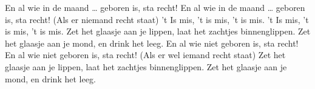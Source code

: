 \beginverse*
En al wie in de maand … geboren is, sta recht!
En al wie in de maand … geboren is, sta recht!
\endverse
\beginchorus
 (Als er niemand recht staat)
't Is mis, 't is mis, 't is mis.
't Is mis, 't is mis, 't is mis.
\endchorus
\beginchorus
Zet het glaasje aan je lippen,
laat het zachtjes binnenglippen.
Zet het glaasje aan je mond,
en drink het leeg.
\endchorus
\beginverse*
En al wie niet geboren is, sta recht!
En al wie niet geboren is, sta recht!
\endverse
\beginverse*
(Als er wel iemand recht staat)
Zet het glaasje aan je lippen,
laat het zachtjes binnenglippen.
Zet het glaasje aan je mond,
en drink het leeg.
\endverse
\endsong